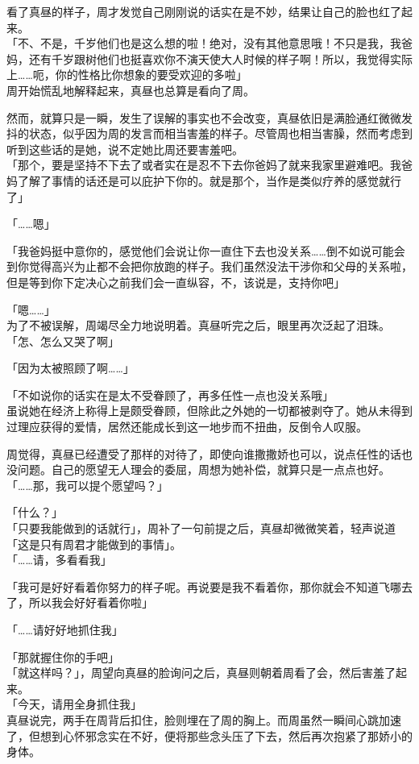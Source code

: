 看了真昼的样子，周才发觉自己刚刚说的话实在是不妙，结果让自己的脸也红了起来。\\

「不、不是，千岁他们也是这么想的啦！绝对，没有其他意思哦！不只是我，我爸妈，还有千岁跟树他们也挺喜欢你不演天使大人时候的样子啊！所以，我觉得实际上……呃，你的性格比你想象的要受欢迎的多啦」\\

周开始慌乱地解释起来，真昼也总算是看向了周。

然而，就算只是一瞬，发生了误解的事实也不会改变，真昼依旧是满脸通红微微发抖的状态，似乎因为周的发言而相当害羞的样子。尽管周也相当害臊，然而考虑到听到这些话的是她，说不定她比周还要害羞吧。\\

「那个，要是坚持不下去了或者实在是忍不下去你爸妈了就来我家里避难吧。我爸妈了解了事情的话还是可以庇护下你的。就是那个，当作是类似疗养的感觉就行了」

「……嗯」

「我爸妈挺中意你的，感觉他们会说让你一直住下去也没关系……倒不如说可能会到你觉得高兴为止都不会把你放跑的样子。我们虽然没法干涉你和父母的关系啦，但是等到你下定决心之前我们会一直纵容，不，该说是，支持你吧」

「嗯……」\\

为了不被误解，周竭尽全力地说明着。真昼听完之后，眼里再次泛起了泪珠。\\

「怎、怎么又哭了啊」

「因为太被照顾了啊……」

「不如说你的话实在是太不受眷顾了，再多任性一点也没关系哦」\\

虽说她在经济上称得上是颇受眷顾，但除此之外她的一切都被剥夺了。她从未得到过理应获得的爱情，居然还能成长到这一地步而不扭曲，反倒令人叹服。

周觉得，真昼已经遭受了那样的对待了，即使向谁撒撒娇也可以，说点任性的话也没问题。自己的愿望无人理会的委屈，周想为她补偿，就算只是一点点也好。\\

「……那，我可以提个愿望吗？」

「什么？」\\

「只要我能做到的话就行」，周补了一句前提之后，真昼却微微笑着，轻声说道「这是只有周君才能做到的事情」。\\

「……请，多看看我」

「我可是好好看着你努力的样子呢。再说要是我不看着你，那你就会不知道飞哪去了，所以我会好好看着你啦」

「……请好好地抓住我」

「那就握住你的手吧」\\

「就这样吗？」，周望向真昼的脸询问之后，真昼则朝着周看了会，然后害羞了起来。\\

「今天，请用全身抓住我」\\

真昼说完，两手在周背后扣住，脸则埋在了周的胸上。而周虽然一瞬间心跳加速了，但想到心怀邪念实在不好，便将那些念头压了下去，然后再次抱紧了那娇小的身体。
